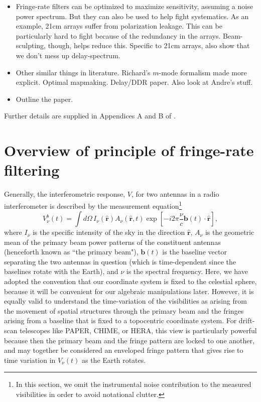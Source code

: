 \documentclass[twocolumn,apj,numberedappendix]{emulateapj}
\newcommand{\rhat}{\hat{\mathbf{r}}}
\begin{document}
\begin{itemize}
\item Fringe-rate filters can be optimized to maximize sensitivity, assuming a noise power spectrum.  But they can also be used to help fight systematics.  As an example, 21cm arrays suffer from polarization leakage.  This can be particularly hard to fight because of the redundancy in the arrays.  Beam-sculpting, though, helps reduce this.  Specific to 21cm arrays, also show that we don't mess up delay-spectrum.
\item Other similar things in literature.  Richard's $m$-mode formalism made more explicit.  Optimal mapmaking.  Delay/DDR paper.  Also look at Andre's stuff.
\item Outline the paper.
\end{itemize}
Further details are supplied in Appendices A and B of \citet{parsons_et_al2013}.




\section{Overview of principle of fringe-rate filtering}
\label{sec:overview}
Generally, the interferometric response, $V$, for two antennas in a radio interferometer is described
by the measurement equation\footnote{In this section, we omit the instrumental noise contribution to the measured visibilities in order to avoid notational clutter.}
\begin{equation}
V^b_\nu(t)=\int d\Omega \, {I_\nu(\rhat) A_\nu(\rhat,t) \exp \left[-i2\pi \frac{\nu}{c}  \mathbf{b}(t) \cdot \rhat\right]},
\end{equation}
where $I_\nu$ is the specific intensity of the sky in the direction $\rhat$,
$A_\nu$ is the geometric mean of the primary beam power patterns of the constituent antennas (henceforth known as ``the primary beam"), $\mathbf{ b}(t)$ is the baseline vector separating the two antennas in question (which is time-dependent since the baselines rotate with the Earth), and $\nu$ is the spectral
frequency.
Here, we have adopted the convention that our coordinate system is fixed to the celestial sphere, because it will be convenient for our algebraic manipulations later. However, it is equally valid to understand the time-variation of the visibilities as arising from the movement of spatial structures through the primary beam and the fringes arising from a baseline that is fixed to a topocentric coordinate system. For drift-scan telescopes like PAPER, CHIME, or HERA, this view is particularly powerful because then the primary beam and the fringe pattern are locked to one another, and may together be considered an enveloped fringe pattern that gives rise
to time variation in $V_\nu(t)$ as the Earth rotates.
\end{document}
